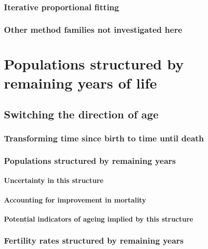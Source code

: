   \section{Iterative proportional fitting}
      
  \section{Other method families not investigated here}
     


\part{Populations structured by remaining years of life}
\chapter{Switching the direction of age}
  
  
  \section{Transforming time since birth to time until death}
    
   
  \section{Populations structured by remaining years}
    
    \subsection{Uncertainty in this structure}
      
    \subsection{Accounting for improvement in mortality}
      
    \subsection{Potential indicators of ageing implied by this structure}
      
  \section{Fertility rates structured by remaining years}
    
    
